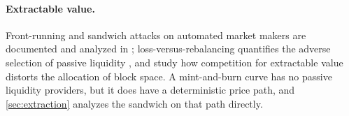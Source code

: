 \paragraph{Extractable value.} Front-running and sandwich attacks on automated market makers are documented and analyzed in \citep{daian2020,zhou2021hft,qin2022bev,heimbach2022sandwich}; loss-versus-rebalancing quantifies the adverse selection of passive liquidity \citep{milionis2022lvr}, and \citet{capponi2025} study how competition for extractable value distorts the allocation of block space. A mint-and-burn curve has no passive liquidity providers, but it does have a deterministic price path, and \cref{sec:extraction} analyzes the sandwich on that path directly.
